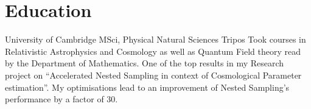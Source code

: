 \documentclass{CurriculumVitae}[10pt, condensed]
\begin{document}
{\begin{comment}
  \job{Jul 2018}{Oct 2018} {Cambridge University Computer Lab}
  {Software Development Intern} {Designed, and improved a dynamic road
    network All-pairs shortest path solver, using a highly
    paralleliseable graph traversal framework, which improved
    performance by a factor of 50.  }
\end{comment}

\begin{comment}
  \job{Jan 2013}{May 2015}  {Masterlagebra.org} {Backend Developer}
  {Designed and implemented problems for university level automated
    linear algebra training program. Problems were related to complex
    numbers, Gram-Schmidt ortho-normalisation process, analytical geometry
    problems involving planes and lines in higher dimensions.
  }
\end{comment}

\begin{comment}
  \section*{Volunteer work} \job{2015}{2017}{Queens' College}
  {Technical director} {I supervised a self-motivated team of
    volunteers to set up and dismantle decorations at the Queens'
    College Fitzpatrick Hall, as well as handle Audio visual equiment
    including but not limited to ROBE colorspots, human sized
    speakers, trusses, stage hydraulics, a laser projector and
    multiple smoke machines.  During QErgs 2016 (which is the largest
    indoors rowing competition in the world), we had a large
    issue. The Ergs (devices which measured the sportspeople's
    performance) were located at the far side of the hall, right under
    the projector screen and opposite the projector. They had to be
    connected to the projector via a CAT6 shielded wire. As it turned
    out, the shielded wire didn't have enough range, and the race
    would have been called off.  I quickly made a skype call with
    desktop sharing to the Wi-Fi connected laptop at the far side. }
\end{comment}

  \vfill
  \section*{Education}%

   {University of Cambridge} {MSci, }
  {Physical Natural Sciences Tripos} {Took courses in Relativistic
    Astrophysics and Cosmology as well as Quantum Field theory read by
    the Department of Mathematics. One of the top results in my
    Research project on ``Accelerated Nested Sampling in context of
    Cosmological Parameter estimation''. My optimisations lead to an
    improvement of Nested Sampling's performance by a factor of 30. }

}
\end{document}
